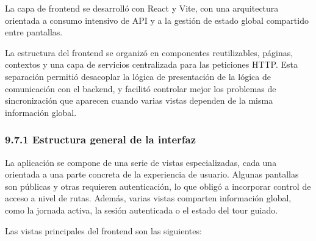 La capa de frontend se desarrolló con React y Vite, con una arquitectura orientada a consumo intensivo de API y a la gestión de estado global compartido entre pantallas.
 
La estructura del frontend se organizó en componentes reutilizables, páginas, contextos y una capa de servicios centralizada para las peticiones HTTP.
Esta separación permitió desacoplar la lógica de presentación de la lógica de comunicación con el backend, y facilitó controlar mejor los problemas de
sincronización que aparecen cuando varias vistas dependen de la misma información global.
 
\subsubsection{9.7.1 Estructura general de la interfaz}
 
La aplicación se compone de una serie de vistas especializadas, cada una orientada a una parte concreta de la experiencia de usuario.
Algunas pantallas son públicas y otras requieren autenticación, lo que obligó a incorporar control de acceso a nivel de rutas. Además, varias vistas
comparten información global, como la jornada activa, la sesión autenticada o el estado del tour guiado.
 
Las vistas principales del frontend son las siguientes:
 
